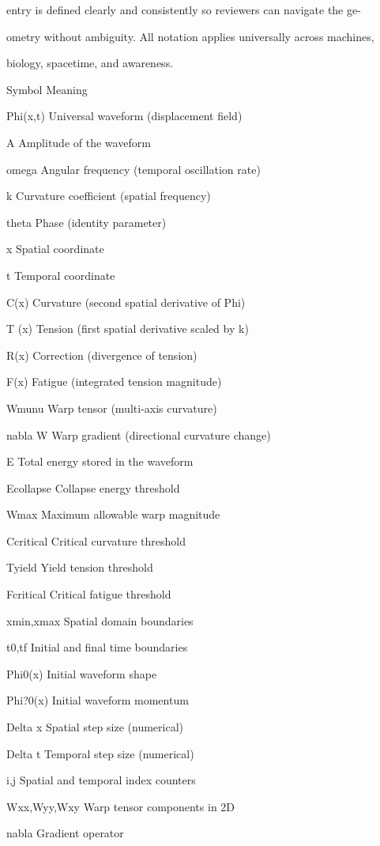 \documentclass[10pt]{article}
\begin{document}
entry is defined clearly and consistently so reviewers can navigate the ge-

ometry without ambiguity. All notation applies universally across machines,

biology, spacetime, and awareness.


Symbol Meaning

Phi(x,t) Universal waveform (displacement field)

A Amplitude of the waveform

omega Angular frequency (temporal oscillation rate)

k Curvature coefficient (spatial frequency)

theta Phase (identity parameter)

x Spatial coordinate

t Temporal coordinate

C(x) Curvature (second spatial derivative of Phi)

T (x) Tension (first spatial derivative scaled by k)

R(x) Correction (divergence of tension)

F(x) Fatigue (integrated tension magnitude)

Wmunu Warp tensor (multi-axis curvature)

nabla W Warp gradient (directional curvature change)

E Total energy stored in the waveform

Ecollapse Collapse energy threshold

Wmax Maximum allowable warp magnitude

Ccritical Critical curvature threshold

Tyield Yield tension threshold

Fcritical Critical fatigue threshold

xmin,xmax Spatial domain boundaries

t0,tf Initial and final time boundaries

Phi0(x) Initial waveform shape

Phi?0(x) Initial waveform momentum

Delta x Spatial step size (numerical)

Delta t Temporal step size (numerical)

i,j Spatial and temporal index counters

Wxx,Wyy,Wxy Warp tensor components in 2D

nabla  Gradient operator
\end{document}
